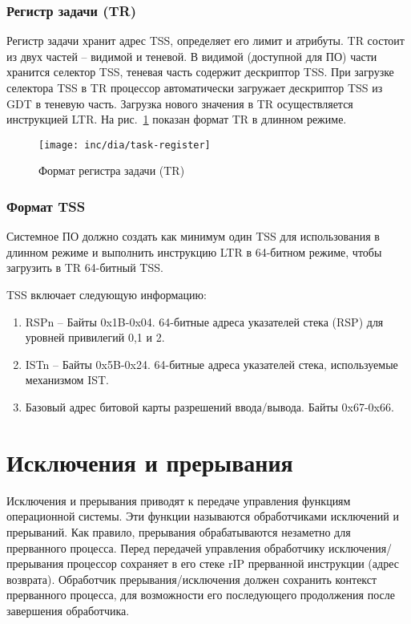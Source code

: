 \subsubsection*{Регистр задачи (TR)}
Регистр задачи хранит адрес TSS, определяет его лимит и атрибуты. TR состоит
из двух частей -- видимой и теневой. В видимой (доступной для ПО) части хранится селектор TSS,
теневая часть содержит дескриптор TSS. При загрузке селектора TSS в TR
процессор автоматически загружает дескриптор TSS из GDT в теневую часть.
Загрузка нового значения в TR осуществляется инструкцией LTR. На
рис.~\ref{fig:task_register} показан формат TR в длинном режиме.

\begin{figure}[ht!]
  \centering
  \texttt{[image: inc/dia/task-register]}
  \caption{Формат регистра задачи (TR)}
  \label{fig:task_register}
\end{figure}

\subsubsection*{Формат TSS}
Системное ПО должно создать как минимум один TSS для использования в длинном режиме и
выполнить инструкцию LTR в 64-битном режиме, чтобы загрузить в TR 64-битный TSS.

TSS включает следующую информацию:
\begin{enumerate}[1.]
\item RSPn -- Байты 0x1B-0x04. 64-битные адреса указателей стека (RSP) для
	уровней привилегий 0,1 и 2.
\item ISTn -- Байты 0x5B-0x24. 64-битные адреса указателей стека, используемые
	механизмом IST.
\item Базовый адрес битовой карты разрешений ввода/вывода. Байты 0x67-0x66.
\end{enumerate}



\section{Исключения и прерывания}
\label{sec:exceptions_and_interrupts}

Исключения и прерывания приводят к передаче управления функциям операционной
системы. Эти функции называются обработчиками исключений и прерываний.
Как правило, прерывания обрабатываются незаметно для прерванного
процесса. Перед передачей управления обработчику исключения/прерывания
процессор сохраняет в его стеке rIP прерванной инструкции (адрес возврата).
Обработчик прерывания/исключения должен сохранить контекст прерванного процесса,
для возможности его последующего продолжения после завершения обработчика.

